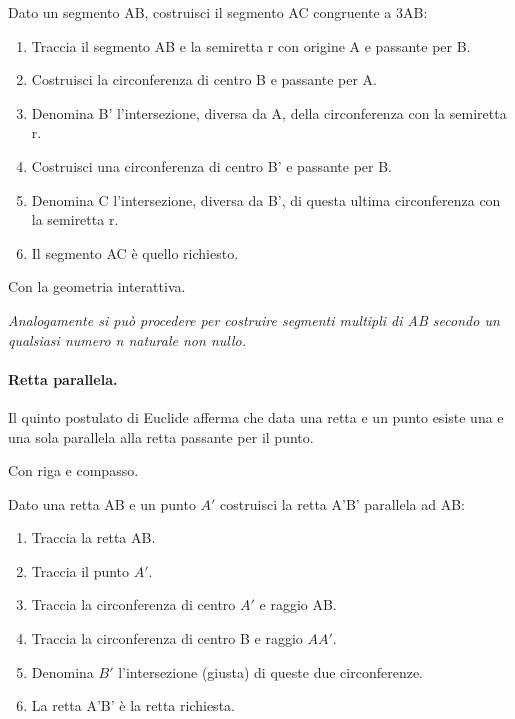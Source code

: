 \begin{procedura}\label{proc:fonda_multiplo}
  Dato un segmento AB, costruisci il segmento AC congruente a 3AB:
  \begin{enumerate} [nosep]
    \item 
    Traccia il segmento AB e la semiretta r con origine A e passante per B.
    \item 
    Costruisci la circonferenza di centro B e passante per A.
    \item 
    Denomina B' l'intersezione, diversa da A, della circonferenza con la 
semiretta r.
    \item 
    Costruisci una circonferenza di centro B' e passante per B.
    \item 
    Denomina C l'intersezione, diversa da B', di questa ultima 
circonferenza 
con la semiretta r.
    \item 
    Il segmento AC è quello richiesto.
  \end{enumerate}
\end{procedura}

\ifcoding
Con la geometria interattiva.


\fi

\textit{Analogamente si può procedere per costruire segmenti multipli di AB 
secondo un qualsiasi numero n naturale non nullo.}

\paragraph{Retta parallela.} Il quinto postulato di Euclide afferma che 
data 
una retta e un punto esiste una e una sola parallela alla retta passante per 
il 
punto.

Con riga e compasso.

\begin{procedura}\label{proc:fonda_parallela}
  Dato una retta AB e un punto \(A'\) costruisci la retta A'B' parallela ad 
AB:
  \begin{enumerate} [nosep]
    \item 
    Traccia la retta AB.    
    \item 
    Traccia il punto \(A'\).    
    \item 
    Traccia la circonferenza di centro \(A'\) e raggio AB.   
    \item 
    Traccia la circonferenza di centro B e raggio \(AA'\).
    \item 
    Denomina \(B'\) l'intersezione (giusta) di queste due circonferenze. 
    \item 
    La retta A'B' è la retta richiesta.    
  \end{enumerate}
\end{procedura}

